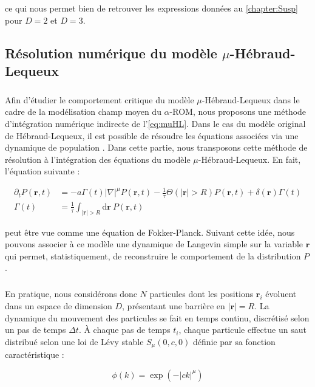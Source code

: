 \noindent ce qui nous permet bien de retrouver les expressions données au \autoref{chapter:Susp} pour $D=2$ et $D=3$.

\subsection{Résolution numérique du modèle $\mu$-Hébraud-Lequeux}

\label{sec:ResolNumMuHL}

\subparagraph{}Afin d'étudier le comportement critique du modèle $\mu$-Hébraud-Lequeux dans le cadre de la modélisation champ moyen du $\alpha$-ROM, nous proposons une méthode d'intégration numérique indirecte de l'\autoref{eq:muHL}. Dans le cas du modèle original de Hébraud-Lequeux, il est possible de résoudre les équations associées via une dynamique de population \cite{bouchaud_spontaneous_2016}. Dans cette partie, nous transposons cette méthode de résolution à l'intégration des équations du modèle $\mu$-Hébraud-Lequeux. En fait, l'équation suivante : 

\begin{equation}
\begin{aligned}
    \partial_t P(\mathbf{r}, t) &= -a\Gamma (t)|\nabla|^{\mu} P(\mathbf{r}, t) - \frac{1}{\tau}\Theta(|\mathbf{r}|>R)P(\mathbf{r}, t) + \delta(\mathbf{r})\Gamma (t)\\
     \Gamma (t) &= \frac{1}{\tau}\int_{|\mathbf{r}|>R}\mathrm{d}\mathbf{r}~P(\mathbf{r}, t)
\end{aligned}
\end{equation}

\noindent peut être vue comme une équation de Fokker-Planck. Suivant cette idée, nous pouvons associer à ce modèle une dynamique de Langevin simple sur la variable $\mathbf{r}$ qui permet, statistiquement, de reconstruire le comportement de la distribution $P$.

\subparagraph{}En pratique, nous considérons donc $N$ particules dont les positions $\mathbf{r}_i$ évoluent dans un espace de dimension $D$, présentant une barrière en $|\mathbf{r}|=R$. La dynamique du mouvement des particules se fait en temps continu, discrétisé selon un pas de temps $\Delta t$. \`A chaque pas de temps $t_i$, chaque particule effectue un saut distribué selon une loi de Lévy stable $S_\mu(0,c,0)$ définie par sa fonction caractéristique :

\begin{equation}
	\phi(k) = \exp (-|ck|^\mu)
\end{equation}

